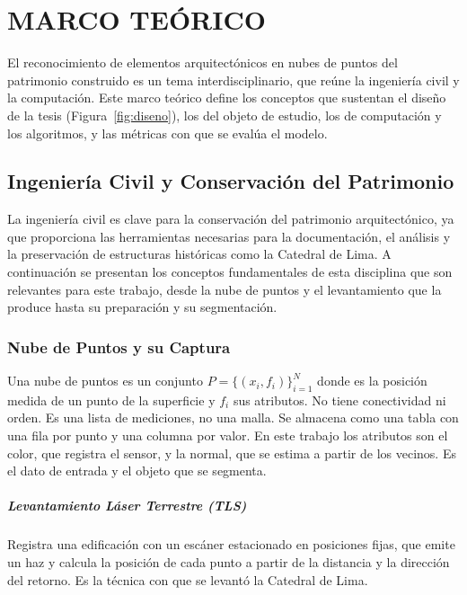 \chapter{MARCO TEÓRICO}
\label{cap:teorico}

El reconocimiento de elementos arquitectónicos en nubes de puntos del patrimonio
construido es un tema interdisciplinario, que reúne la ingeniería civil y la
computación. Este marco teórico define los conceptos que sustentan el diseño de la
tesis (Figura~\ref{fig:diseno}), los del objeto de estudio, los de computación y
los algoritmos, y las métricas con que se evalúa el modelo.

\section{Ingeniería Civil y Conservación del Patrimonio}
\label{sec:civil}

La ingeniería civil es clave para la conservación del patrimonio
arquitectónico, ya que proporciona las herramientas necesarias para la
documentación, el análisis y la preservación de estructuras históricas como la
Catedral de Lima. A continuación se presentan los conceptos fundamentales de
esta disciplina que son relevantes para este trabajo, desde la nube de puntos y
el levantamiento que la produce hasta su preparación y su segmentación.

\subsection{Nube de Puntos y su Captura}
\label{sec:nube}

Una nube de puntos es un conjunto $P=\{(x_i,f_i)\}_{i=1}^{N}$ donde
 es la posición medida de un punto de la superficie y $f_i$
sus atributos. No tiene conectividad ni orden. Es una lista de mediciones, no
una malla.
Se almacena como una tabla con una fila por punto y una
columna por valor. En este trabajo los atributos son el color, que registra el
sensor, y la normal, que se estima a partir de los vecinos.
Es el dato de entrada y el objeto que se segmenta.

\paragraph*{Levantamiento Láser Terrestre (TLS)}
\label{sec:tls}

Registra una edificación con un escáner estacionado en posiciones fijas, que emite
un haz y calcula la posición de cada punto a partir de la distancia y la dirección
del retorno. Es la técnica con que se levantó la Catedral de Lima.

